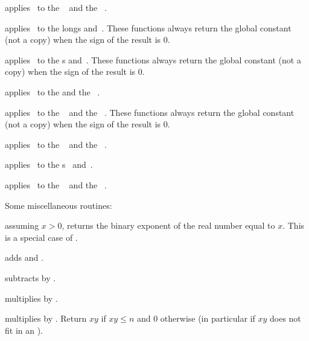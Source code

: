  applies \op\ to the
~ and the ~.

 applies \op\ to the longs
 and~. These functions always return the global constant
 (not a copy) when the sign of the result is $0$.

 applies \op\ to the
s  and~. These functions always return the global
constant  (not a copy) when the sign of the result is $0$.

 applies \op\ to the
  and the ~.

 applies \op\ to the
~ and the ~. These functions always return
the global constant  (not a copy) when the sign of the result
is $0$.

 applies \op\ to the
~ and the ~.

 applies \op\ to the
s~ and~.

 applies \op\ to the
~ and the ~.

\noindent Some miscellaneous routines:

 assuming $x > 0$, returns the binary exponent of
the real number equal to $x$. This is a special case of .



 adds  and .



 subtracts  by .

 multiplies  by .

 multiplies  by .
Return $xy$ if $xy \leq n$ and $0$ otherwise (in particular if $xy$ does not
fit in an ).

